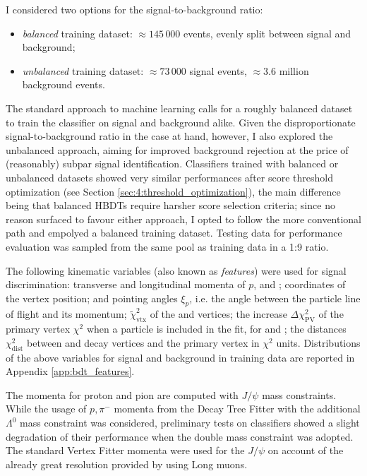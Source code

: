 I considered two options for the signal-to-background ratio:
\begin{itemize}
	\item \textit{balanced} training dataset: $\approx 145\,000$ events, evenly split between signal and background;
	\item \textit{unbalanced} training dataset: $\approx 73\,000$ signal events, $\approx 3.6$ million background events.
\end{itemize}
The standard approach to machine learning calls for a roughly balanced dataset to train the classifier on signal and background alike.
Given the disproportionate signal-to-background ratio in the case at hand, however, I also explored the unbalanced approach, aiming for improved background rejection at the price of (reasonably) subpar signal identification.
Classifiers trained with balanced or unbalanced datasets showed very similar performances after score threshold optimization (see Section \ref{sec:4:threshold_optimization}), the main difference being that balanced HBDTs require harsher score selection criteria;
since no reason surfaced to favour either approach, I opted to follow the more conventional path and empolyed a balanced training dataset.
Testing data for performance evaluation was sampled from the same pool as training data in a 1:9 ratio.

The following kinematic variables (also known as \textit{features}) were used for signal discrimination:
transverse and longitudinal momenta of $p$, \pim and \jpsi;
coordinates of the \lambdadecay vertex position;
\lbz and \lz pointing angles $\xi_p$, i.e. the angle between the particle line of flight and its momentum;
$\tilde{\chi}^2_\text{vtx}$ of the \demonstratorshort and \lambdadecay vertices;
the increase $\Delta \chi^2_\text{PV}$ of the primary vertex $\chi^2$ when a particle is included in the fit, for \lbz and \lz;
the distances $\chi^2_\text{dist}$ between \lbz and \lz decay vertices and the primary vertex in $\chi^2$ units.
Distributions of the above variables for signal and background in training data are reported in Appendix \ref{app:bdt_features}.

The momenta for proton and pion are computed with $J/\psi$ mass constraints.
While the usage of $p,\pi^-$ momenta from the Decay Tree Fitter with the additional $\Lambda^0$ mass constraint was considered, preliminary tests on classifiers showed a slight degradation of their performance when the double mass constraint was adopted.
The standard Vertex Fitter momenta were used for the $J/\psi$ on account of the already great resolution provided by using Long muons.

